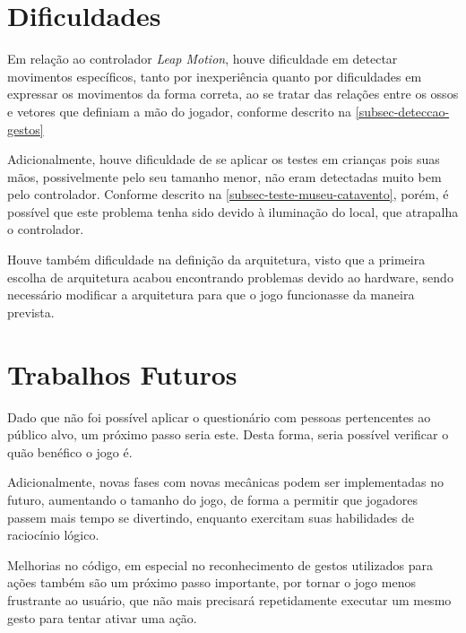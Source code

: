 \section{Dificuldades}\label{sec-conc-dificuldades}

Em relação ao controlador \textit{Leap Motion}, houve dificuldade em detectar
movimentos específicos, tanto por inexperiência quanto por dificuldades 
em expressar os movimentos da forma correta, ao se tratar das relações entre 
os ossos e vetores que definiam a mão do jogador, conforme descrito na
\autoref{subsec-deteccao-gestos}

Adicionalmente, houve dificuldade de se aplicar os testes em crianças pois
suas mãos, possivelmente pelo seu tamanho menor, não eram detectadas muito 
bem pelo controlador. Conforme descrito na 
\autoref{subsec-teste-museu-catavento}, porém, é possível que este problema 
tenha sido devido à iluminação do local, que atrapalha o controlador.

Houve também dificuldade na definição da arquitetura, visto que a 
primeira escolha de arquitetura acabou encontrando problemas devido 
ao hardware, sendo necessário modificar a arquitetura para que o jogo 
funcionasse da maneira prevista.



\section{Trabalhos Futuros}\label{sec-conc-trabalhos-futuros}

Dado que não foi possível aplicar o questionário com pessoas pertencentes ao 
público alvo, um próximo passo seria este. Desta forma, seria possível verificar 
o quão benéfico o jogo é.

Adicionalmente, novas fases com novas mecânicas podem ser implementadas no 
futuro, aumentando o tamanho do jogo, de forma a permitir que jogadores 
passem mais tempo se divertindo, enquanto exercitam suas habilidades de 
raciocínio lógico.

Melhorias no código, em especial no reconhecimento de gestos utilizados 
para ações também são um próximo passo importante, por tornar o jogo 
menos frustrante ao usuário, que não mais precisará repetidamente executar 
um mesmo gesto para tentar ativar uma ação.